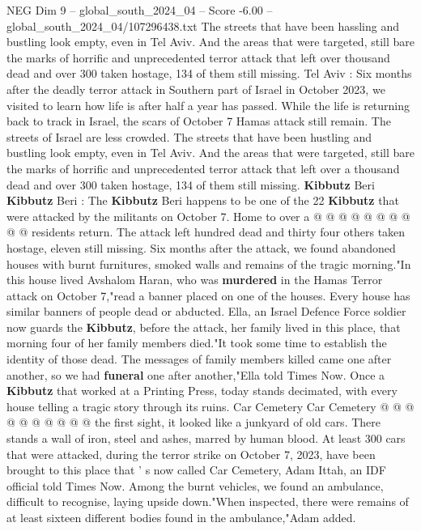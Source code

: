 \begin{textsample}{NEG Dim 9 – global\_south\_2024\_04 – Score -6.00 – global\_south\_2024\_04/107296438.txt}  \label{ex:f9_neg_324}
The streets that have been hassling and bustling look empty, even in Tel Aviv.
And the areas that were targeted, still bare the marks of horrific and unprecedented terror attack that left over thousand dead and over 300 taken hostage, 134 of them still missing.
Tel Aviv : Six months after the deadly terror attack in Southern part of Israel in October 2023, we visited to learn how life is after half a year has passed.
While the life is returning back to track in Israel, the scars of October 7 Hamas attack still remain.
The streets of Israel are less crowded.
The streets that have been hustling and bustling look empty, even in Tel Aviv.
And the areas that were targeted, still bare the marks of horrific and unprecedented terror attack that left over a thousand dead and over 300 taken hostage, 134 of them still missing. \textbf{Kibbutz} Beri \textbf{Kibbutz} Beri : The \textbf{Kibbutz} Beri happens to be one of the 22 \textbf{Kibbutz} that were attacked by the militants on October 7.
Home to over a @ @ @ @ @ @ @ @ @ @ residents return.
The attack left hundred dead and thirty four others taken hostage, eleven still missing.
Six months after the attack, we found abandoned houses with burnt furnitures, smoked walls and remains of the tragic morning."In this house lived Avshalom Haran, who was \textbf{murdered} in the Hamas Terror attack on October 7,"read a banner placed on one of the houses.
Every house has similar banners of people dead or abducted.
Ella, an Israel Defence Force soldier now guards the \textbf{Kibbutz}, before the attack, her family lived in this place, that morning four of her family members died."It took some time to establish the identity of those dead.
The messages of family members killed came one after another, so we had \textbf{funeral} one after another,"Ella told Times Now.
Once a \textbf{Kibbutz} that worked at a Printing Press, today stands decimated, with every house telling a tragic story through its ruins.
Car Cemetery Car Cemetery @ @ @ @ @ @ @ @ @ @ the first sight, it looked like a junkyard of old cars.
There stands a wall of iron, steel and ashes, marred by human blood.
At least 300 cars that were attacked, during the terror strike on October 7, 2023, have been brought to this place that ' s now called Car Cemetery, Adam Ittah, an IDF official told Times Now.
Among the burnt vehicles, we found an ambulance, difficult to recognise, laying upside down."When inspected, there were remains of at least sixteen different bodies found in the ambulance,"Adam added.

\end{textsample}
